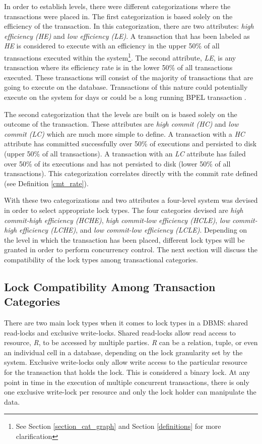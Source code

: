 \documentclass[conference]{IEEEtran}
\begin{document}
In order to establish levels, there were different categorizations where the transactions were placed in. The first categorization is based solely on the efficiency of the transaction. In this categorization, there are two attributes: \textit{high efficiency (HE)} and \textit{low efficiency (LE)}. A transaction that has been labeled as \textit{HE} is considered to execute with an efficiency in the upper 50\% of all transactions executed within the system\footnote{See Section \ref{section_cat_graph} and Section \ref{definitions} for more clarification}. The second attribute, \textit{LE}, is any transaction where its efficiency rate is in the lower 50\% of all transactions executed. These transactions will consist of the majority of transactions that are going to execute on the database. Transactions of this nature could potentially execute on the system for days or could be a long running BPEL transaction \cite{BPEL}.

The second categorization that the levels are built on is based solely on the outcome of the transaction. These attributes are \textit{high commit (HC)} and \textit{low commit (LC)} which are much more simple to define. A transaction with a \textit{HC} attribute has committed successfully over 50\% of executions and persisted to disk (upper 50\% of all transactions). A transaction with an \textit{LC} attribute has failed over 50\% of its executions and has not persisted to disk (lower 50\% of all transactions). This categorization correlates directly with the commit rate defined (see Definition \ref{cmt_rate}).

With these two categorizations and two attributes a four-level system was devised in order to select appropriate lock types. The four categories devised are \textit{high commit-high efficiency (HCHE)}, \textit{high commit-low efficiency (HCLE)}, \textit{low commit-high efficiency (LCHE)}, and \textit{low commit-low efficiency (LCLE)}. Depending on the level in which the transaction has been placed, different lock types will be granted in order to perform concurrency control. The next section will discuss the compatibility of the lock types among transactional categories.

\subsection{Lock Compatibility Among Transaction Categories}

There are two main lock types when it comes to lock types in a DBMS: shared read-locks and exclusive write-locks. Shared read-locks allow read access to resource, \textit{R}, to be accessed by multiple parties. \textit{R} can be a relation, tuple, or even an individual cell in a database, depending on the lock granularity set by the system. Exclusive write-locks only allow write access to the particular resource for the transaction that holds the lock. This is considered a binary lock. At any point in time in the execution of multiple concurrent transactions, there is only one exclusive write-lock per resource and only the lock holder can manipulate the data.
\end{document}
